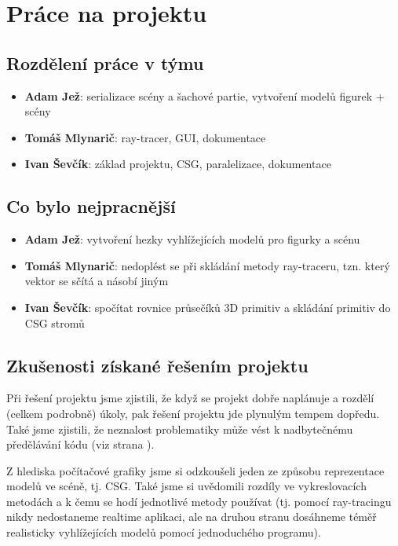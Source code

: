 \documentclass[12pt,a4paper,titlepage,final]{report}
\newcommand\AuthorA{Adam Jež}
\newcommand\AuthorB{Tomáš Mlynarič}
\newcommand\AuthorC{Ivan Ševčík}
\begin{document}
\chapter{Práce na projektu}

\section{Rozdělení práce v týmu}

\begin{itemize}
\item \textbf{\AuthorA}: serializace scény a šachové partie, vytvoření modelů figurek + scény 
\item \textbf{\AuthorB}: ray-tracer, GUI, dokumentace
\item \textbf{\AuthorC}: základ projektu, CSG, paralelizace,  dokumentace
\end{itemize}

\section{Co bylo nejpracnější}

\begin{itemize}
\item \textbf{\AuthorA}: vytvoření hezky vyhlížejících modelů pro figurky a scénu
\item \textbf{\AuthorB}: nedoplést se při skládání metody ray-traceru, tzn. který vektor se sčítá a násobí jiným
\item \textbf{\AuthorC}: spočítat rovnice průsečíků 3D primitiv a skládání primitiv do CSG stromů
\end{itemize}


\section{Zkušenosti získané řešením projektu}

Při řešení projektu jsme zjistili, že když se projekt dobře naplánuje a rozdělí (celkem podrobně) úkoly, pak řešení projektu jde plynulým tempem dopředu. Také jsme zjistili, že neznalost problematiky může vést k nadbytečnému předělávání kódu (viz strana \pageref{sec:fps}).

Z hlediska počítačové grafiky jsme si odzkoušeli jeden ze způsobu reprezentace modelů ve scéně, tj. CSG. Také jsme si uvědomili rozdíly ve vykreslovacích metodách a k čemu se hodí jednotlivé metody používat (tj. pomocí ray-tracingu nikdy nedostaneme realtime aplikaci, ale na druhou stranu dosáhneme téměř realisticky vyhlížejících modelů pomocí jednoduchého programu). 
\end{document}
